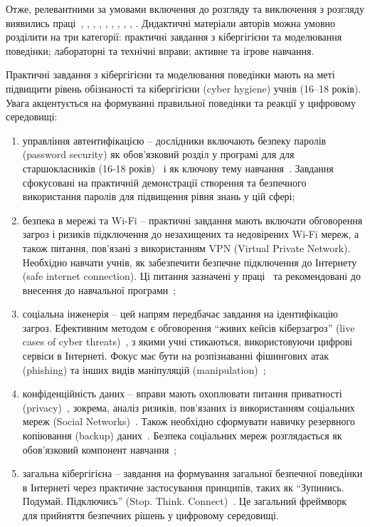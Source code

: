Отже, релевантними за умовами включення до розгляду та виключення з розгляду виявились праці~\cite{Antunes2021}, \cite{Gough2024394}, \cite{Ismail2024}, \cite{Jerman2024}, \cite{Jacob20222248}, \cite{Jerman20259093}, \cite{Jeyamala2023319}, \cite{Karimnia2022121}, \cite{Mirkovic2020866}, \cite{Mishra202436}. Дидактичні матеріали авторів можна умовно розділити на три категорії: практичні завдання з кібергігієни та моделювання поведінки; лабораторні та технічні вправи;
активне та ігрове навчання.

Практичні завдання з кібергігієни та моделювання поведінки мають на меті підвищити рівень обізнаності та кібергігієни (cyber hygiene) учнів (16–18 років). Увага акцентується на формуванні правильної поведінки та реакції у цифровому середовищі:
\begin{enumerate}[label=--] %
\item
управління автентифікацією -- дослідники включають безпеку паролів (password security) як обов'язковий розділ у програмі для для старшокласників (16-18 років)~\cite{Karimnia2022121} і як ключову тему навчання~\cite{Antunes2021}. Завдання сфокусовані на практичній демонстрації створення та безпечного використання паролів для підвищення рівня знань у цій сфері;
\item
безпека в мережі та Wi-Fi -- практичні завдання мають включати обговорення загроз і ризиків підключення до незахищених та недовірених Wi-Fi мереж, а також питання, пов'язані з використанням VPN (Virtual Private Network). Необхідно навчати учнів, як забезпечити безпечне підключення до Інтернету (safe internet connection). Ці питання зазначені у праці~\cite{Antunes2021} та рекомендовані до внесення до навчальної програми~\cite{Karimnia2022121};
\item
соціальна інженерія -- цей напрям передбачає завдання на ідентифікацію загроз. Ефективним методом є обговорення ``живих кейсів кіберзагроз'' (live cases of cyber threats)~\cite{Jerman20259093}, з якими учні стикаються, використовуючи цифрові сервіси в Інтернеті. Фокус має бути на розпізнаванні фішингових атак (phishing) та інших видів маніпуляцій (manipulation)~\cite{Antunes2021};
\item
конфіденційність даних -- вправи мають охоплювати питання приватності (privacy)~\cite{Antunes2021}, зокрема, аналіз ризиків, пов'язаних із використанням соціальних мереж (Social Networks)~\cite{Antunes2021}. Також необхідно сформувати навичку резервного копіювання (backup) даних~\cite{Antunes2021}. Безпека соціальних мереж розглядається як обов'язковий компонент навчання~\cite{Karimnia2022121};
\item 
загальна кібергігієна -- завдання на формування загальної безпечної поведінки в Інтернеті через практичне застосування принципів, таких як ``Зупинись. Подумай. Підключись'' (Stop. Think. Connect)~\cite{Ismail2024}. Це загальний фреймворк для прийняття безпечних рішень у цифровому середовищі.
\end{enumerate}

